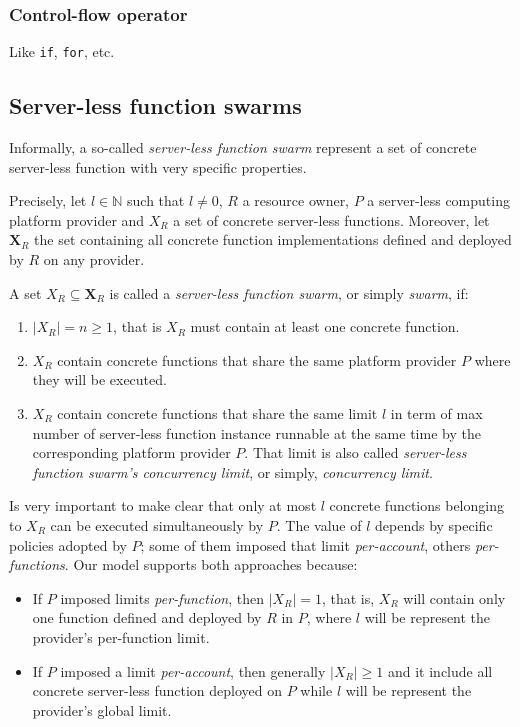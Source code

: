 \documentclass[10pt,a4paper]{article}
\theoremstyle{definition}
\begin{document}
\subsubsection{Control-flow operator}

Like \texttt{if}, \texttt{for}, etc.

\subsection{Server-less function swarms}

Informally, a so-called \textit{server-less function swarm} represent a set of concrete server-less function with very specific properties.

Precisely, let $l \in \mathbb{N}$ such that $l \neq 0$, $R$ a resource owner, $P$ a server-less computing platform provider and  $X_R$ a set of concrete server-less functions. Moreover, let $\textbf{X}_R$ the set containing all concrete function implementations defined and deployed by $R$ on any provider. 

A set $X_R \subseteq \textbf{X}_R$ is called a \textit{server-less function swarm}, or simply \textit{swarm}, if:

\begin{enumerate}
\item $|X_{R}| = n \geq 1$, that is $X_{R}$ must contain at least one concrete function.
\item $X_{R}$ contain concrete functions that share the same platform provider $P$ where they will be executed.
\item $X_{R}$ contain concrete functions that share the same limit $l$ in term of max number of server-less function instance runnable at the same time by the corresponding platform provider $P$. That limit is also called \textit{server-less function swarm's concurrency limit}, or simply, \textit{concurrency limit}. 
\end{enumerate}

Is very important to make clear that only at most $l$ concrete functions belonging to $X_R$ can be executed simultaneously by $P$. The value of $l$ depends by specific policies adopted by $P$; some of them imposed that limit \textit{per-account}, others \textit{per-functions}. Our model supports both approaches because:

\begin{itemize}

\item If $P$ imposed limits \textit{per-function}, then $|X_{R}| = 1$, that is, $X_{R}$ will contain only one function defined and deployed by $R$ in $P$, where $l$ will be represent the provider's per-function limit.

\item If $P$ imposed a limit \textit{per-account}, then generally $|X_{R}| \geq 1$ and it include all concrete server-less function deployed on $P$ while $l$ will be represent the provider's global limit. 
\end{itemize}
\end{document}
